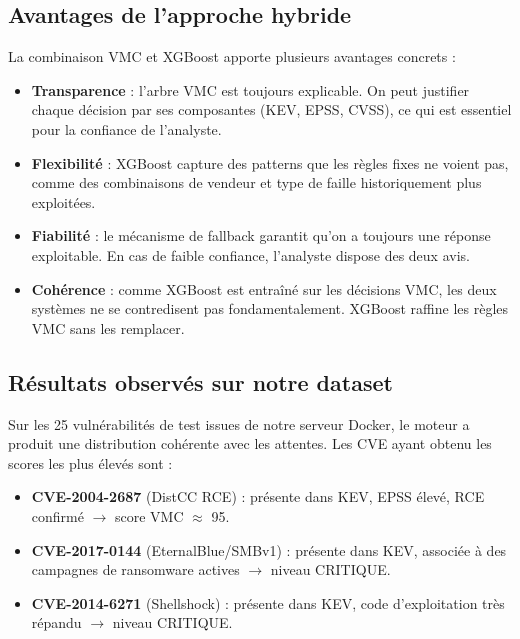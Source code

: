 \documentclass[runningheads]{llncs}
\begin{document}
\subsection{Avantages de l'approche hybride}

La combinaison VMC et XGBoost apporte plusieurs avantages concrets :

\begin{itemize}
    \item \textbf{Transparence} : l'arbre VMC est toujours explicable. On peut justifier chaque décision par ses composantes (KEV, EPSS, CVSS), ce qui est essentiel pour la confiance de l'analyste.
    \item \textbf{Flexibilité} : XGBoost capture des patterns que les règles fixes ne voient pas, comme des combinaisons de vendeur et type de faille historiquement plus exploitées.
    \item \textbf{Fiabilité} : le mécanisme de fallback garantit qu'on a toujours une réponse exploitable. En cas de faible confiance, l'analyste dispose des deux avis.
    \item \textbf{Cohérence} : comme XGBoost est entraîné sur les décisions VMC, les deux systèmes ne se contredisent pas fondamentalement. XGBoost raffine les règles VMC sans les remplacer.
\end{itemize}

\subsection{Résultats observés sur notre dataset}

Sur les 25 vulnérabilités de test issues de notre serveur Docker, le moteur a produit une distribution cohérente avec les attentes. Les CVE ayant obtenu les scores les plus élevés sont :

\begin{itemize}
    \item \textbf{CVE-2004-2687} (DistCC RCE) : présente dans KEV, EPSS élevé, RCE confirmé $\rightarrow$ score VMC $\approx$ 95.
    \item \textbf{CVE-2017-0144} (EternalBlue/SMBv1) : présente dans KEV, associée à des campagnes de ransomware actives $\rightarrow$ niveau CRITIQUE.
    \item \textbf{CVE-2014-6271} (Shellshock) : présente dans KEV, code d'exploitation très répandu $\rightarrow$ niveau CRITIQUE.
\end{itemize}
\end{document}
